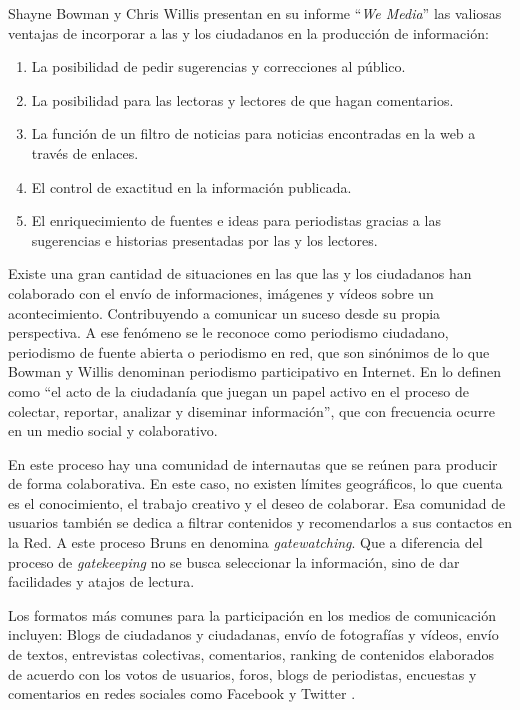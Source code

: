 Shayne Bowman y Chris Willis presentan en su informe ``\emph{We Media}'' \cite{wethemedia} las valiosas ventajas de incorporar a las y los ciudadanos en la producción de información:
\begin{enumerate}
\item La posibilidad de pedir sugerencias y correcciones al público.
\item La posibilidad para las lectoras y lectores de que hagan comentarios.
\item La función de un filtro de noticias para noticias encontradas en la web a través de enlaces.
\item El control de exactitud en la información publicada.
\item El enriquecimiento de fuentes e ideas para periodistas gracias a las sugerencias e historias presentadas por las y los lectores.
\end{enumerate}

Existe una gran cantidad de situaciones en las que las y los ciudadanos han colaborado con el envío de informaciones, imágenes y vídeos sobre un acontecimiento. Contribuyendo a comunicar un suceso desde su propia perspectiva. 
A ese fenómeno se le reconoce como periodismo ciudadano, periodismo de fuente abierta o periodismo en red, que son sinónimos de lo que Bowman y Willis denominan periodismo participativo en Internet. En \cite{wethemedia} lo definen como ``el acto de la ciudadanía que juegan un papel activo en el proceso de colectar, reportar, analizar y diseminar información'', que con frecuencia ocurre en un medio social y colaborativo. %

En este proceso hay una comunidad de internautas que se reúnen para producir de forma colaborativa. En este caso, no existen límites geográficos, lo que cuenta es el conocimiento, el trabajo creativo y el deseo de colaborar. Esa comunidad de usuarios también se dedica a filtrar contenidos y recomendarlos a sus contactos en la Red. A este proceso Bruns en \cite{quteprints189} denomina \emph{gatewatching}. Que a diferencia del proceso de \emph{gatekeeping} no se busca seleccionar la información, sino de dar facilidades y atajos de lectura.

Los formatos más comunes para la participación en los medios de comunicación incluyen: Blogs de ciudadanos y ciudadanas, envío de fotografías y vídeos, envío de textos, entrevistas colectivas, comentarios, ranking de contenidos elaborados de acuerdo con los votos de usuarios, foros, blogs de periodistas, encuestas y comentarios en redes sociales como Facebook y Twitter \cite{doi17512781003640703}. %

